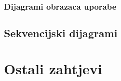				
					
				\subsubsection{Dijagrami obrazaca uporabe}
					
				
			\subsection{Sekvencijski dijagrami}
				
%				
	
		\section{Ostali zahtjevi}
		
%		 
			 
			 
			 
	